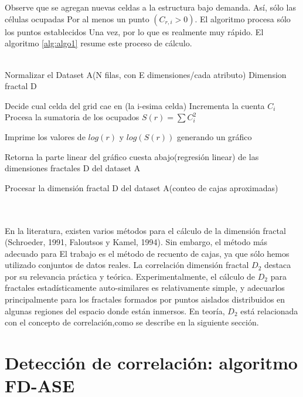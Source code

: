 \\\\
Observe que se agregan nuevas celdas a la estructura bajo demanda. Así, sólo las células ocupadas
Por al menos un punto $(C_{r,i}> 0)$. El algoritmo procesa sólo los puntos establecidos
Una vez, por lo que es realmente muy rápido. El algoritmo \ref{alg:algo1} resume este proceso de cálculo.
\\\\
\begin{algorithm}
\begin{algorithmic}[1]
\REQUIRE Normalizar el Dataset A(N filas, con E dimensiones/cada atributo)
\label{lin:lineaRara}
\ENSURE  Dimension fractal D

    \STATE Decide cual celda del grid cae en (la i-esima celda)
    \STATE Incrementa la cuenta $C_i$
    \ENDFOR
    \STATE Procesa la sumatoria de los ocupados $S(r) = \sum C_i^2$
\ENDFOR

\STATE Imprime los valores de $log(r)$ y $log(S(r))$ generando un gráfico

\STATE Retorna la parte linear del gráfico cuesta abajo(regresión linear) de las dimensiones fractales D del dataset A

\end{algorithmic}
\caption{Procesar la dimensión fractal D del dataset A(conteo de cajas aproximadas)}
\label{alg:algo1}
\end{algorithm}

\\\\

En la literatura, existen varios métodos para el cálculo de la dimensión fractal
(Schroeder, 1991, Faloutsos y Kamel, 1994). Sin embargo, el método más adecuado para
El trabajo es el método de recuento de cajas, ya que sólo hemos utilizado conjuntos de datos reales. La correlación dimensión fractal $D_2$ destaca por su relevancia práctica y teórica. Experimentalmente, el cálculo de $D_2$ para fractales estadísticamente auto-similares es relativamente simple, y adecuarlos principalmente para los fractales formados por puntos aislados distribuidos en algunas regiones del espacio donde están inmersos. En teoría, $D_2$ está relacionada con el concepto de correlación,como se describe en la siguiente sección.

\section{Detección de correlación: algoritmo FD-ASE}


